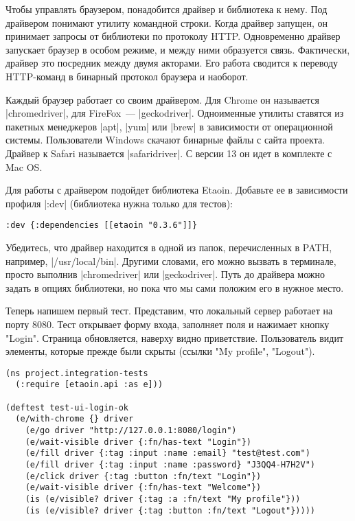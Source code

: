 Чтобы управлять браузером, понадобится драйвер и библиотека к нему. Под
драйвером понимают утилиту командной строки. Когда драйвер запущен, он принимает
запросы от библиотеки по протоколу HTTP. Одновременно драйвер запускает браузер
в особом режиме, и между ними образуется связь. Фактически, драйвер это
посредник между двумя акторами. Его работа сводится к переводу HTTP-команд в
бинарный протокол браузера и наоборот.

Каждый браузер работает со своим драйвером. Для Chrome он называется
\spverb|chromedriver|, для FireFox~--- \spverb|geckodriver|. Одноименные утилиты ставятся из
пакетных менеджеров \spverb|apt|, \spverb|yum| или \spverb|brew| в зависимости от операционной
системы. Пользователи Windows скачают бинарные файлы с сайта проекта. Драйвер к
Safari называется \spverb|safaridriver|. С версии 13 он идет в комплекте с Mac OS.

Для работы с драйвером подойдет библиотека Etaoin.
Добавьте ее в зависимости профиля \spverb|:dev| (библиотека нужна только для тестов):

\begin{verbatim}
:dev {:dependencies [[etaoin "0.3.6"]]}
\end{verbatim}

Убедитесь, что драйвер находится в одной из папок, перечисленных в PATH,
например, \spverb|/usr/local/bin|. Другими словами, его можно вызвать в терминале,
просто выполнив \spverb|chromedriver| или \spverb|geckodriver|. Путь до драйвера можно задать
в опциях библиотеки, но пока что мы сами положим его в нужное место.

Теперь напишем первый тест. Представим, что локальный сервер работает на
порту 8080. Тест открывает форму входа, заполняет поля и нажимает кнопку
"Login". Страница обновляется, наверху видно приветствие. Пользователь видит
элементы, которые прежде были скрыты (ссылки "My profile", "Logout").

\begin{verbatim}
(ns project.integration-tests
  (:require [etaoin.api :as e]))

(deftest test-ui-login-ok
  (e/with-chrome {} driver
    (e/go driver "http://127.0.0.1:8080/login")
    (e/wait-visible driver {:fn/has-text "Login"})
    (e/fill driver {:tag :input :name :email} "test@test.com")
    (e/fill driver {:tag :input :name :password} "J3QQ4-H7H2V")
    (e/click driver {:tag :button :fn/text "Login"})
    (e/wait-visible driver {:fn/has-text "Welcome"})
    (is (e/visible? driver {:tag :a :fn/text "My profile"}))
    (is (e/visible? driver {:tag :button :fn/text "Logout"}))))
\end{verbatim}

